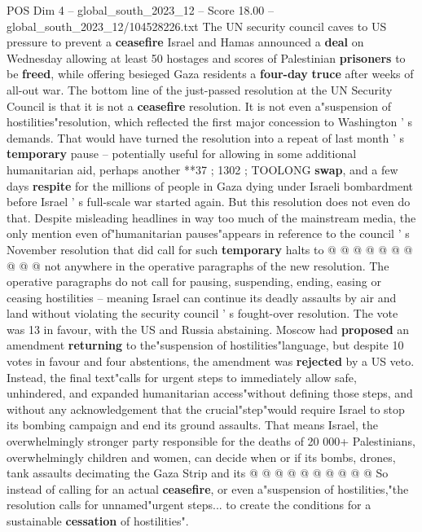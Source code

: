 \begin{textsample}{POS Dim 4 – global\_south\_2023\_12 – Score 18.00 – global\_south\_2023\_12/104528226.txt}  \label{ex:f4_pos_147}
The UN security council caves to US pressure to prevent a \textbf{ceasefire} Israel and Hamas announced a \textbf{deal} on Wednesday allowing at least 50 hostages and scores of Palestinian \textbf{prisoners} to be \textbf{freed}, while offering besieged Gaza residents a \textbf{four-day} \textbf{truce} after weeks of all-out war.
The bottom line of the just-passed resolution at the UN Security Council is that it is not a \textbf{ceasefire} resolution.
It is not even a"suspension of hostilities"resolution, which reflected the first major concession to Washington ' s demands.
That would have turned the resolution into a repeat of last month ' s \textbf{temporary} pause -- potentially useful for allowing in some additional humanitarian aid, perhaps another **37 ; 1302 ; TOOLONG \textbf{swap}, and a few days \textbf{respite} for the millions of people in Gaza dying under Israeli bombardment before Israel ' s full-scale war started again.
But this resolution does not even do that.
Despite misleading headlines in way too much of the mainstream media, the only mention even of"humanitarian pauses"appears in reference to the council ' s November resolution that did call for such \textbf{temporary} halts to @ @ @ @ @ @ @ @ @ @ not anywhere in the operative paragraphs of the new resolution.
The operative paragraphs do not call for pausing, suspending, ending, easing or ceasing hostilities -- meaning Israel can continue its deadly assaults by air and land without violating the security council ' s fought-over resolution.
The vote was 13 in favour, with the US and Russia abstaining.
Moscow had \textbf{proposed} an amendment \textbf{returning} to the"suspension of hostilities"language, but despite 10 votes in favour and four abstentions, the amendment was \textbf{rejected} by a US veto.
Instead, the final text"calls for urgent steps to immediately allow safe, unhindered, and expanded humanitarian access"without defining those steps, and without any acknowledgement that the crucial"step"would require Israel to stop its bombing campaign and end its ground assaults.
That means Israel, the overwhelmingly stronger party responsible for the deaths of 20 000+ Palestinians, overwhelmingly children and women, can decide when or if its bombs, drones, tank assaults decimating the Gaza Strip and its @ @ @ @ @ @ @ @ @ @ So instead of calling for an actual \textbf{ceasefire}, or even a"suspension of hostilities,"the resolution calls for unnamed"urgent steps... to create the conditions for a sustainable \textbf{cessation} of hostilities".

\end{textsample}
